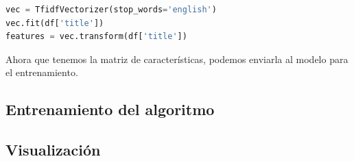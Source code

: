 \documentclass{uimppracticas}
\begin{document}
\begin{lstlisting}[language=python]
vec = TfidfVectorizer(stop_words='english')
vec.fit(df['title'])
features = vec.transform(df['title'])
\end{lstlisting}

Ahora que tenemos la matriz de características, podemos enviarla al modelo para el entrenamiento.

\subsection{Entrenamiento del algoritmo}

\subsection{Visualización}

\renewcommand{\refname}{Bibliografía}


\end{document}
